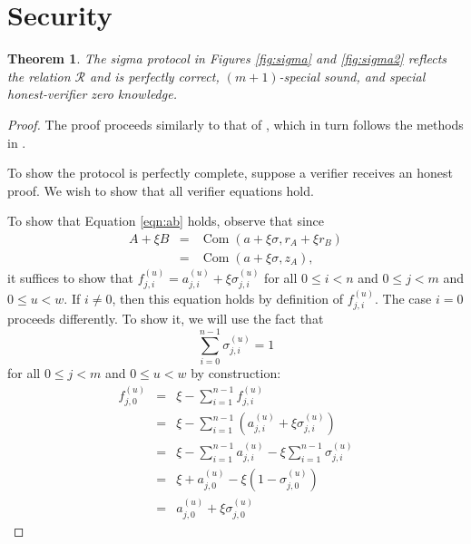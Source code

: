 \documentclass{article}
\newcommand{\com}{\operatorname{Com}}
\newcommand{\sumi}{\sum_{i=0}^{n-1}}
\newtheorem{theorem}{Theorem}
\theoremstyle{definition}
\begin{document}
\section{Security}
\begin{theorem}
The sigma protocol in Figures \ref{fig:sigma} and \ref{fig:sigma2} reflects the relation $\mathcal{R}$ and is perfectly correct, $(m+1)$-special sound, and special honest-verifier zero knowledge.
\end{theorem}

\begin{proof}
The proof proceeds similarly to that of \cite{triptych}, which in turn follows the methods in \cite{groth,bootle}.

To show the protocol is perfectly complete, suppose a verifier receives an honest proof.
We wish to show that all verifier equations hold.

To show that Equation \ref{eqn:ab} holds, observe that since
\begin{eqnarray*}
A + \xi B &=& \com(a + \xi\sigma,r_A + \xi r_B) \\
&=& \com(a + \xi\sigma,z_A),
\end{eqnarray*}
it suffices to show that $f_{j,i}^{(u)} = a_{j,i}^{(u)} + \xi\sigma_{j,i}^{(u)}$ for all $0 \leq i < n$ and $0 \leq j < m$ and $0 \leq u < w$.
If $i \neq 0$, then this equation holds by definition of $f_{j,i}^{(u)}$.
The case $i = 0$ proceeds differently.
To show it, we will use the fact that $$\sumi \sigma_{j,i}^{(u)} = 1$$ for all $0 \leq j < m$ and $0 \leq u < w$ by construction:
\begin{eqnarray*}
f_{j,0}^{(u)} &=& \xi - \sum_{i=1}^{n-1} f_{j,i}^{(u)} \\
&=& \xi - \sum_{i=1}^{n-1} \left( a_{j,i}^{(u)} + \xi\sigma_{j,i}^{(u)} \right) \\
&=& \xi - \sum_{i=1}^{n-1} a_{j,i}^{(u)} - \xi\sum_{i=1}^{n-1} \sigma_{j,i}^{(u)} \\
&=& \xi + a_{j,0}^{(u)} - \xi\left( 1 - \sigma_{j,0}^{(u)} \right) \\
&=& a_{j,0}^{(u)} + \xi\sigma_{j,0}^{(u)}
\end{eqnarray*}


\end{proof}
\end{document}

